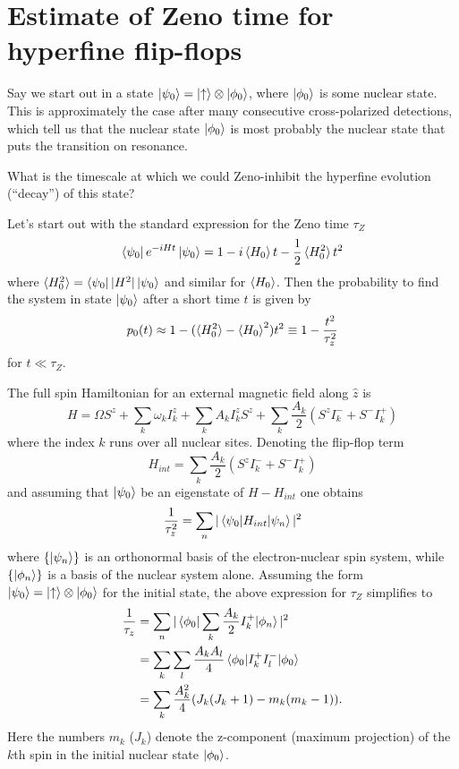 \documentclass[aps, pra, amsfonts, a4paper, showpacs]{revtex4-1}
\begin{document}
\newcommand{\kpz}{\ket{\psi_0}}
\newcommand{\bpz}{\bra{\psi_0}}
\newcommand{\hz}{\braket{H_0}}
\newcommand{\hsqz}{\braket{H^2_0}}

\section*{Estimate of Zeno time for hyperfine flip-flops}

Say we start out in a state $\ket{\psi_0}=\ket{\uparrow}\otimes\ket{\phi_0}$, where $\ket{\phi_0}$ is some nuclear state. This is approximately the case after many consecutive cross-polarized detections, which tell us that the nuclear state $\ket{\phi_0}$ is most probably the nuclear state that puts the transition on resonance. 

What is the timescale at which we could Zeno-inhibit the hyperfine evolution (``decay'') of this state? 

\vspace{0.5cm}
Let's start out with the standard expression for the Zeno time $\tau_Z$ \cite{pascazio_all_2014}
\[
\bpz e^{-i H t} \kpz = 1 - i\hz t -\frac{1}{2} \hsqz t^2
\]
where $ \hsqz = \bpz | H^2 | \kpz$ and similar for $\hz$.
Then the probability to find the system in state $\kpz$ after a short time $t$ is given by
\begin{equation}
p_0(t) \approx 1- (\hsqz - \hz^2)t^2 \equiv 1- \frac{t^2}{\tau_z^2} 
\label{Eq: p0}
\end{equation}
for $t \ll \tau_Z$.

The full spin Hamiltonian for an external magnetic field along $\hat{z}$ is
\begin{equation}
H=\Omega S^z + \sum_k \omega_k I^z_k + \sum_k A_k I^z_k S^z + \sum_k \frac{A_k}{2}(S^zI^-_k + S^- I_k^+)
\label{Eq: H}
\end{equation}
where the index $k$ runs over all nuclear sites. Denoting the flip-flop term
\[H_{int} = \sum_k \frac{A_k}{2}(S^zI^-_k + S^- I_k^+) \]
and assuming that $\kpz$ be an eigenstate of $H-H_{int}$ one obtains
\begin{equation}
\frac{1}{\tau_z^2} = \sum_n |\braket{\psi_0|H_{int}|\psi_n}|^2
\label{Eq: simp}
\end{equation}
where $\{\ket{\psi_n}\}$ is an orthonormal basis of the electron-nuclear spin system, while $\{\ket{\phi_n}\}$ is a basis of the nuclear system alone.
Assuming the form $\ket{\psi_0}=\ket{\uparrow}\otimes\ket{\phi_0}$ for the initial state, the above expression for $\tau_Z$ simplifies to
\begin{equation}
\begin{split}
\frac{1}{\tau_z} &=\sum_n |\braket{\phi_0 | \sum_k \frac{A_k}{2} I_k^+ |\phi_n}|^2 \\
&= \sum_k \sum_l \frac{A_k A_l}{4}\braket{\phi_0 | I_k^+ I_l^- |\phi_0} \\
&= \sum_k \frac{A_k^2}{4}(J_k(J_k+1) - m_k(m_k -1)).
\end{split}
\end{equation}
Here the numbers $m_k$ ($J_k$) denote the z-component (maximum projection) of the $k$th spin in the initial nuclear state $\ket{\phi_0}$.
\end{document}
